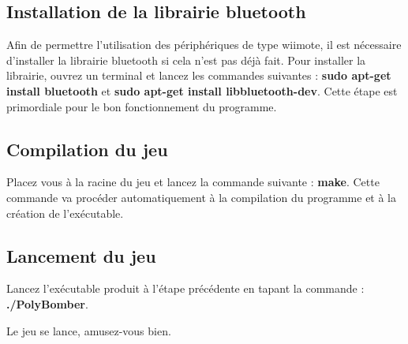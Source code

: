 \subsection{Installation de la librairie bluetooth}
	Afin de permettre l'utilisation des périphériques de type wiimote, il est nécessaire d'installer la librairie bluetooth si cela n'est pas déjà fait. Pour installer la librairie, ouvrez un terminal et lancez les commandes suivantes : \textbf{sudo apt-get install bluetooth} et \textbf{sudo apt-get install libbluetooth-dev}. Cette étape est primordiale pour le bon fonctionnement du programme.
	

\subsection{Compilation du jeu}
	Placez vous à la racine du jeu et lancez la commande suivante : \textbf{make}.
Cette commande va procéder automatiquement à la compilation du programme et à la création de l'exécutable.


\subsection{Lancement du jeu}
	Lancez l'exécutable produit à l'étape précédente en tapant la commande : \textbf{./PolyBomber}.
	
	
\begin{center}	
	Le jeu se lance, amusez-vous bien.
\end{center}
	

